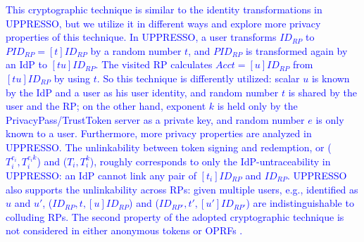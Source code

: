 
\textcolor{blue}{This cryptographic technique is similar to the identity transformations in UPPRESSO,
    but we utilize it in different ways and explore more privacy properties of this technique.
In UPPRESSO, a user transforms $ID_{RP}$ to $PID_{RP} = [t]ID_{RP}$ by a random number $t$,
 and $PID_{RP}$ is transformed again by an IdP to $[tu]ID_{RP}$.
The visited RP calculates $Acct = [u]ID_{RP}$ from $[tu]ID_{RP}$ by using $t$.
So this technique is differently utilized:
scalar $u$ is known by the IdP and a user as his user identity, and
random number $t$ is shared by the user and the RP; on the other hand,
exponent $k$ is held only by the PrivacyPass/TrustToken server as a private key,
 and random number $e$ is only known to a user.
Furthermore, more privacy properties are analyzed in UPPRESSO.
The unlinkability between token signing and redemption, or
($T_i^{e_i}, T_i^{e_ik}$) and  ($T_i, T_i^k$),
roughly corresponds to only the IdP-untraceability in UPPRESSO:
 an IdP cannot link any pair of $[t_i]ID_{RP}$ and $ID_{RP}$.
UPPRESSO also supports the unlinkability across RPs:
given multiple users, e.g., identified as $u$ and $u'$,
    ($ID_{RP}, t, [u]ID_{RP}$) and ($ID_{RP'}, t', [u']ID_{RP'}$) are indistinguishable to
    colluding RPs.
The second property of the adopted cryptographic technique is not considered
     in either anonymous tokens \cite{privacypass,trusttoken} or OPRFs \cite{oprf-proved}.}

